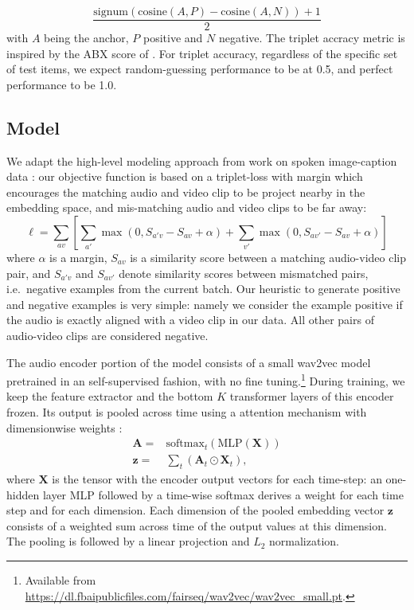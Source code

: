 \begin{equation}
  \frac{\mathrm{signum}(\mathrm{cosine}(A, P) - \mathrm{cosine}(A, N)) + 1}{2}
  \label{eq:triplet-acc}
\end{equation}
with $A$ being the anchor, $P$ positive and $N$ negative. The triplet
accracy metric is inspired by the ABX score of \citet{schatz2016abx}.
For triplet accuracy, regardless of the specific set of test items, we
expect random-guessing performance to be at 0.5, and perfect
performance to be 1.0.

\subsection{Model}

We adapt the high-level modeling approach from work on spoken
image-caption data
\citep{harwath2016unsupervised,chrupala-etal-2017-representations}:
our objective function is based on a triplet-loss with margin which
encourages the matching audio and video clip to be project nearby in
the embedding space, and mis-matching audio and video clips to be far
away:
\begin{equation}
  \ell = \sum_{av}\left[\sum_{a'} \max(0, S_{a'v} - S_{av} +
    \alpha) + \sum_{v'} \max(0, S_{av'} - S_{av} + \alpha) \right]
  \label{eq:triplet}
\end{equation}
where $\alpha$ is a margin, $S_{av}$ is a similarity score between a
matching audio-video clip pair, and $S_{a'v}$ and $S_{av'}$ denote
similarity scores between mismatched pairs, i.e.\ negative examples
from the current batch. Our heuristic to generate positive and
negative examples is very simple: namely we consider the example
positive if the audio is exactly aligned with a video clip in our
data. All other pairs of audio-video clips are considered negative.

The audio encoder portion of the model consists of a small wav2vec
model \citep{wav2vec2} pretrained in an self-supervised fashion, with
no fine tuning.\footnote{Available from
  \url{https://dl.fbaipublicfiles.com/fairseq/wav2vec/wav2vec_small.pt}.}
During training, we keep the feature extractor and the bottom $K$
transformer layers of this encoder frozen. Its output is pooled across
time using a attention mechanism with dimensionwise weights \citep{Merkx2019}:
\begin{equation}
  \begin{aligned}
    \mathbf{A} = & \mathrm{softmax}_t\left(\mathrm{MLP}(\mathbf{X})\right)\\
    \mathbf{z} = & \sum_t \left( \mathbf{A}_t \odot \mathbf{X}_t \right),
  \end{aligned}
  \label{eq:att-pool}
\end{equation}
where $\mathbf{X}$ is the tensor with the encoder output vectors for
each time-step: an one-hidden layer MLP followed by a time-wise
softmax derives a weight for each time step and for each
dimension. Each dimension of the pooled embedding vector $\mathbf{z}$
consists of a weighted sum across time of the output values at this
dimension.
The pooling is followed by a linear projection and $L_2$
normalization.

